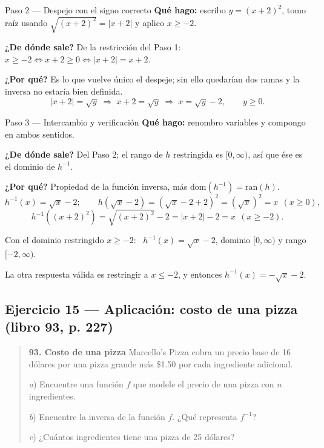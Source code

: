 \documentclass[11pt]{article}
\begin{document}
\begin{paso}{Paso 2 --- Despejo con el signo correcto}
\textbf{Qué hago:} escribo $y=(x+2)^2$, tomo raíz usando $\sqrt{(x+2)^2}=|x+2|$ y aplico $x\ge -2$.

\textbf{¿De dónde sale?} De la restricción del Paso 1: $x\ge -2 \iff x+2\ge 0 \iff |x+2|=x+2$.

\textbf{¿Por qué?} Es lo que vuelve único el despeje; sin ello quedarían dos ramas y la inversa no estaría bien definida.
\[
|x+2|=\sqrt{y} \;\Longrightarrow\; x+2=\sqrt{y} \;\Longrightarrow\; x=\sqrt{y}-2, \qquad y\ge 0.
\]
\end{paso}

\begin{paso}{Paso 3 --- Intercambio y verificación}
\textbf{Qué hago:} renombro variables y compongo en ambos sentidos.

\textbf{¿De dónde sale?} Del Paso 2; el rango de $h$ restringida es $[0,\infty)$, así que ése es el dominio de $h^{-1}$.

\textbf{¿Por qué?} Propiedad de la función inversa, más $\text{dom}(h^{-1})=\text{ran}(h)$.
\[
h^{-1}(x)=\sqrt{x}-2;\qquad
h\!\left(\sqrt{x}-2\right)=\left(\sqrt{x}-2+2\right)^2=\left(\sqrt{x}\right)^2=x \ \ (x\ge0),
\]
\[
h^{-1}\!\left((x+2)^2\right)=\sqrt{(x+2)^2}-2=|x+2|-2=x \ \ (x\ge-2).
\]
\end{paso}

\begin{resp}
Con el dominio restringido $x\ge -2$: \ $h^{-1}(x)=\sqrt{x}-2$, dominio $[0,\infty)$ y rango $[-2,\infty)$.

\medskip
La otra respuesta válida es restringir a $x\le -2$, y entonces $h^{-1}(x)=-\sqrt{x}-2$.
\end{resp}

\subsection*{Ejercicio 15 --- Aplicación: costo de una pizza (libro 93, p. 227)}

\begin{quote}
\textbf{93. Costo de una pizza} Marcello's Pizza cobra un precio base de 16 dólares por una pizza grande más \$1.50 por cada ingrediente adicional.

\textit{a}) Encuentre una función $f$ que modele el precio de una pizza con $n$ ingredientes.

\textit{b}) Encuentre la inversa de la función $f$. ¿Qué representa $f^{-1}$?

\textit{c}) ¿Cuántos ingredientes tiene una pizza de 25 dólares?
\end{quote}
\end{document}
